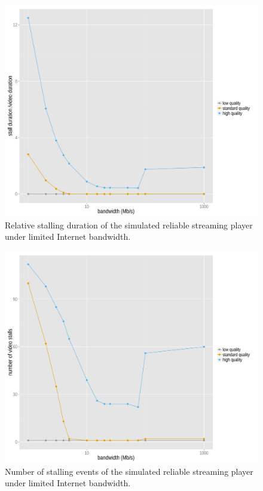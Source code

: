 \begin{figure}[htb]
	\centering
	\includegraphics[width=1.0\textwidth]{images/R-ltesim-bwseries-stallduration.pdf}
	\caption{Relative stalling duration of the simulated reliable streaming player under limited Internet bandwidth.}
\label{c6:fig:ltesim-bwseries-stallduration}
\end{figure}

\begin{figure}[htb]
	\centering
	\includegraphics[width=1.0\textwidth]{images/R-ltesim-bwseries-numstalls.pdf}
	\caption{Number of stalling events of the simulated reliable streaming player under limited Internet bandwidth.}
\label{c6:fig:ltesim-bwseries-numstalls}
\end{figure}


